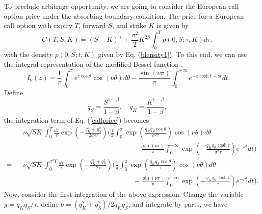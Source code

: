 \documentclass[12pt]{article}
\begin{document}
  To preclude arbitrage opportunity, we are going to consider the European call option price under the absorbing boundary condition.
  The price for a European call option with expiry $T$, forward $S$, and strike $K$ is given by
  \begin{equation}
    C(T,S,K) = (S-K)^+ + \frac{\sigma^2}{2}K^{2\beta}\int_0^Tp(0,S;\tau,K)d\tau,
    \label{callprice}
  \end{equation}
  with the density $p(0,S;t,K)$ given by Eq. (\ref{density1}). To this end, we can use the integral representation of the modified
  Bessel function \cite{DLMF2},
  \begin{equation}
    I_{\nu}(z) = \frac{1}{\pi}\int_0^{\pi}e^{z\cos\theta}\cos(\nu\theta)d\theta
                - \frac{\sin(\nu\pi)}{\pi}\int_0^{+\infty}e^{-z\cosh t - \nu t}dt
  \end{equation}
  Define
  \begin{equation}
    q_S=\frac{S^{1-\beta}}{1-\beta}, \quad q_K=\frac{K^{1-\beta}}{1-\beta},
  \end{equation}
  the integration term of Eq. (\ref{callprice}) becomes
  \begin{eqnarray}
    && \nu\sqrt{SK}\int_0^T\frac{d\tau}{\tau}\exp\left(-\frac{q_K^2+q_S^2}{2\sigma^2\tau}\right)
    \Bigg(\frac{1}{\pi}\int_0^{\pi}\exp\left(\frac{q_Kq_S\cos\theta}{\sigma^2\tau}\right)\cos(\nu\theta)d\theta\nonumber\\
    && \quad\quad\quad\quad\quad\quad\quad\quad\quad\quad\quad\quad\quad\quad\quad\quad
            - \frac{\sin(\nu\pi)}{\pi}\int_0^{+\infty}\exp\left(-\frac{q_Kq_S\cosh t}{\sigma^2\tau}\right)e^{-\nu t}dt\Bigg)\nonumber\\
    = && \nu\sqrt{SK}\int_0^{\sigma^2 T}\frac{d\tau}{\tau}\exp\left(-\frac{q_K^2+q_S^2}{2\tau}\right)
    \Bigg(\frac{1}{\pi}\int_0^{\pi}\exp\left(\frac{q_Kq_S\cos\theta}{\tau}\right)\cos(\nu\theta)d\theta\nonumber\\
    && \quad\quad\quad\quad\quad\quad\quad\quad\quad\quad\quad\quad\quad\quad\quad\quad
            - \frac{\sin(\nu\pi)}{\pi}\int_0^{+\infty}\exp\left(-\frac{q_Kq_S\cosh t}{\tau}\right)e^{-\nu t}dt\Bigg).
  \end{eqnarray}
  Now, consider the first integration of the above expression. Change the variable $y=q_Kq_S/\tau$, define
  $b=(q_K^2+q_S^2)/2q_Kq_S$, and integrate by parts, we have
\end{document}
